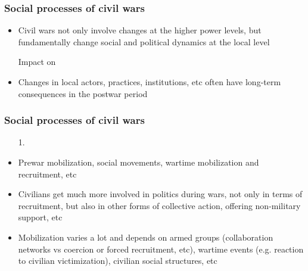 \documentclass[aspectratio=43]{beamer}
\begin{document}

  
\begin{frame}
\frametitle{Social processes of civil wars}
\centering

\begin{itemize}[<+->]
  \item Civil wars not only involve changes at the higher power levels, but fundamentally change social and political dynamics at the local level
  \item[] Impact on {}
  \item[]
  \item Changes in local actors, practices, institutions, etc often have long-term consequences in the postwar period
\end{itemize}

\end{frame}

\begin{frame}
\frametitle{Social processes of civil wars}
\centering

\begin{itemize}[<+->]
  \item[1.] {\color{red}{Political mobilization}}
  \item Prewar mobilization, social movements, wartime mobilization and recruitment, etc
  \item Civilians get much more involved in politics during wars, not only in terms of recruitment, but also in other forms of collective action, offering non-military support, etc
  \item Mobilization varies a lot and depends on armed groups (collaboration networks vs coercion or forced recruitment, etc), wartime events (e.g. reaction to civilian victimization), civilian social structures, etc
\end{itemize}

\end{frame}
\end{document}
